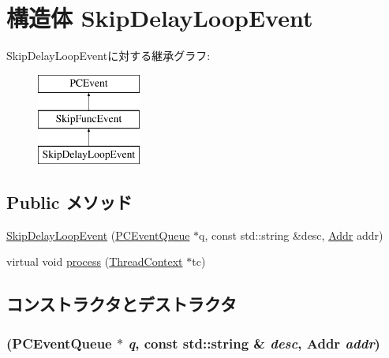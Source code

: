 \hypertarget{structLinuxAlphaSystem_1_1SkipDelayLoopEvent}{
\section{構造体 SkipDelayLoopEvent}
\label{structLinuxAlphaSystem_1_1SkipDelayLoopEvent}
}
SkipDelayLoopEventに対する継承グラフ:\begin{figure}[H]
\begin{center}
\leavevmode
\includegraphics[height=3cm]{structLinuxAlphaSystem_1_1SkipDelayLoopEvent}
\end{center}
\end{figure}
\subsection*{Public メソッド}
\begin{DoxyCompactItemize}
\item 
\hyperlink{structLinuxAlphaSystem_1_1SkipDelayLoopEvent_a7896e57760ebceb961da61bacedabbdc}{SkipDelayLoopEvent} (\hyperlink{classPCEventQueue}{PCEventQueue} $\ast$q, const std::string \&desc, \hyperlink{base_2types_8hh_af1bb03d6a4ee096394a6749f0a169232}{Addr} addr)
\item 
virtual void \hyperlink{structLinuxAlphaSystem_1_1SkipDelayLoopEvent_ad66a9d5ec7cfe597b848a17c0df5cc28}{process} (\hyperlink{classThreadContext}{ThreadContext} $\ast$tc)
\end{DoxyCompactItemize}


\subsection{コンストラクタとデストラクタ}
\hypertarget{structLinuxAlphaSystem_1_1SkipDelayLoopEvent_a7896e57760ebceb961da61bacedabbdc}{
\subsubsection[{SkipDelayLoopEvent}]{ ({\bf PCEventQueue} $\ast$ {\em q}, \/  const std::string \& {\em desc}, \/  {\bf Addr} {\em addr})}}
\label{structLinuxAlphaSystem_1_1SkipDelayLoopEvent_a7896e57760ebceb961da61bacedabbdc}



